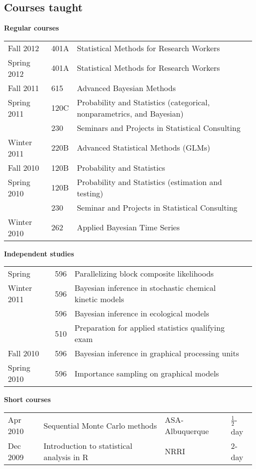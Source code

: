 \documentclass[overlapped,line,letterpaper]{res}
\begin{document}
\begin{resume}

\section{\bf Courses taught}
\vspace{0.1in}

{\bf Regular courses}

\begin{tabular}{lll}
Fall 2012 & 401A & Statistical Methods for Research Workers \\
Spring 2012 & 401A & Statistical Methods for Research Workers \\
Fall 2011 & 615 & Advanced Bayesian Methods \\
\hline
Spring 2011 & 120C & Probability and Statistics (categorical, nonparametrics, and Bayesian) \\
& 230 & Seminars and Projects in Statistical Consulting \\
Winter 2011 & 220B & Advanced Statistical Methods (GLMs) \\
Fall 2010  & 120B & Probability and Statistics \\
Spring 2010 & 120B & Probability and Statistics (estimation and testing) \\
 & 230 & Seminar and Projects in Statistical Consulting \\
Winter 2010 & 262 & Applied Bayesian Time Series
\end{tabular}

{\bf Independent studies}

\begin{tabular}{llll}
Spring & 596 & Parallelizing block composite likelihoods \\
Winter 2011 & 596 & Bayesian inference in stochastic chemical kinetic models \\
& 596 & Bayesian inference in ecological models \\
& 510 & Preparation for applied statistics qualifying exam \\
Fall 2010 & 596 & Bayesian inference in graphical processing units \\
Spring 2010 & 596 & Importance sampling on graphical models
\end{tabular}

{\bf Short courses}

\begin{tabular}{llll}
Apr 2010 & Sequential Monte Carlo methods & ASA-Albuquerque & $\frac{1}{2}$-day \\
Dec 2009 & Introduction to statistical analysis in R & NRRI & 2-day
\end{tabular}


\end{resume}
\end{document}
